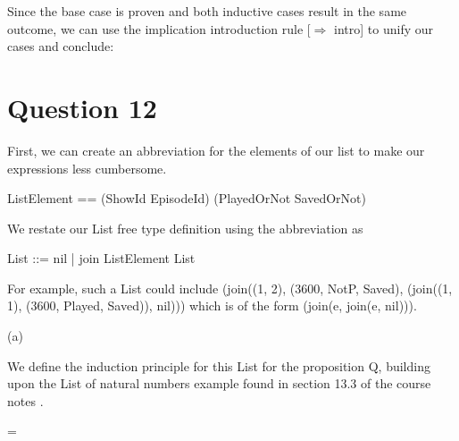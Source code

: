 \documentclass[a4paper,10pt,fleqn]{article}
\begin{document}
\bigskip

\noindent Since the base case is proven and both inductive cases result in the same outcome, we can use the implication introduction rule [$\Rightarrow$ intro] to unify our cases and conclude:

\bigskip

\begin{center}
\end{center}
\bigskip

\section*{Question 12}

\noindent First, we can create an abbreviation for the elements of our list to make our expressions less cumbersome.

\bigskip

\begin{zed}
ListElement == (ShowId \cross EpisodeId) \cross (\nat \cross PlayedOrNot \cross SavedOrNot)
\end{zed}

\noindent We restate our List free type definition using the abbreviation as

\bigskip

\begin{zed}List ::= nil | join \ldata ListElement \cross List \rdata\end{zed}

\noindent For example, such a List could include (join((1, 2), (3600, NotP, Saved), (join((1, 1), (3600, Played, Saved)), nil))) which is of the form (join(e, join(e, nil))).

\bigskip

\noindent\hspace*{\parindent}(a)

\setlength{\leftskip}{\dimexpr\parindent+2em\relax}
\noindent We define the induction principle for this List for the proposition Q, building upon the List of natural numbers example found in section 13.3 of the course notes \citep[page 162]{simpson-notes}.

\bigskip


\bigskip

\setlength{\leftskip}{\dimexpr\parindent+2em\relax}
\savedleftskip=\leftskip
\noindent
{}
\bigskip
\end{document}
